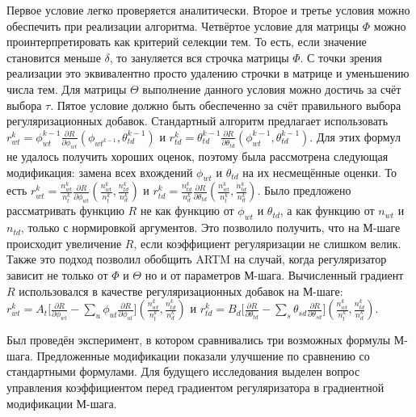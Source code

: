 \documentclass[12pt, twoside]{article}
\begin{document}
Первое условие легко проверяется аналитически. Второе и третье условия можно обеспечить при реализации алгоритма. Четвёртое условие для матрицы $\Phi$ можно проинтерпретировать как критерий селекции тем. То есть, если значение становится меньше $\delta$, то зануляется вся строчка матрицы $\Phi$. С точки зрения реализации это эквивалентно просто удалению строчки в матрице и уменьшению числа тем. Для матрицы $\Theta$ выполнение данного условия можно достичь за счёт выбора $\tau$. Пятое условие должно быть обеспеченно за счёт правильного выбора регуляризационных добавок. Стандартный алгоритм предлагает использовать $r_{wt}^{k} = \phi_{wt}^{k-1} \frac{\partial{R}}{\partial{\phi_{wt}}}(\phi_{wt^{k-1}}, \theta_{td}^{k-1})$ и $r_{td}^{k}=  \theta_{td}^{k-1} \frac{\partial{R}}{\partial{\theta_{td}}}(\phi_{wt}^{k-1}, \theta_{td}^{k-1})$. Для этих формул не удалось получить хороших оценок, поэтому была рассмотрена следующая модификация: замена всех вхождений $\phi_{wt}$ и $\theta_{td}$ на их несмещённые оценки. То есть  $r_{wt}^k=  \frac{n^k_{wt}}{n^k_t}\frac{\partial{R}}{\partial{\phi_{wt}}}\left(\frac{n^k_{wt}}{n^k_t}, \frac{n^k_{td}}{n^k_d}\right)$ и $r_{td}^k=  \frac{n^k_{td}}{n^k_d}\frac{\partial{R}}{\partial{\theta_{td}}}\left(\frac{n^k_{wt}}{n^k_t}, \frac{n^k_{td}}{n^k_d}\right)$. Было предложено рассматривать функцию $R$ не как функцию от $\phi_{wt}$ и $\theta_{td}$, а как функцию от $n_{wt}$ и $n_{td}$, только с нормировкой аргументов. Это позволило получить, что на М-шаге происходит увеличение $R$, если коэффициент регуляризации не слишком велик. Также это подход позволил обобщить ARTM на случай, когда регуляризатор зависит не только от $\Phi$  и $\Theta$ но и от параметров М-шага. Вычисленный градиент $R$ использовался  в качестве регуляризационных добавок на М-шаге: $r^k_{wt} =  A_t \bigl[{\frac{\partial{R}}{\partial{\phi_{wt}}} - \sum\limits_u \phi_{ut} \frac{\partial{R}}{\partial{\phi_{ut}}} }\bigr] \left(\frac{n^k_{wt}}{n^k_t}, \frac{n^k_{td}}{n^k_d}\right)$ и $r^k_{td} =  B_d \bigl[ {\frac{\partial{R}}{\partial{\theta_{td}}} - \sum\limits_s \theta_{sd} \frac{\partial{R}}{\partial{\theta_{sd}}} }\bigr] \left(\frac{n^k_{wt}}{n^k_t}, \frac{n^k_{td}}{n^k_d}\right)$.

Был проведён эксперимент, в котором сравнивались три возможных формулы М-шага. Предложенные модификации показали улучшение по сравнению со стандартными формулами. Для будущего исследования выделен вопрос управления коэффициентом перед градиентом регуляризатора в градиентной модификации М-шага.
\end{document}

